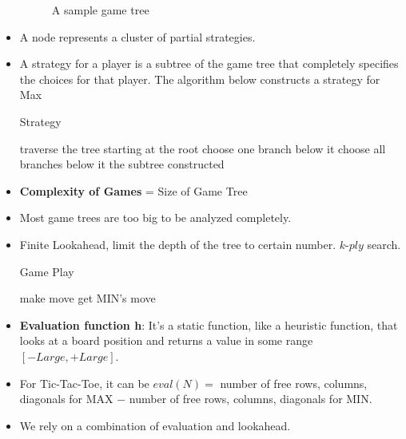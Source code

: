 \documentclass[a4paper]{article}
\begin{document}
\begin{itemize}
\begin{figure}[H]
        \caption{A sample game tree}
    \end{figure}
    \item A node represents a cluster of partial strategies.
    \item A strategy for a player is a subtree of the game tree that completely specifies the choices for that player. The algorithm below constructs a strategy for Max
    \begin{algorithm}[H]
        \caption{Strategy}\label{AI-minimax-strategy}
        \begin{algorithmic}[1]
            \Statex {}
            \State traverse the tree starting at the root
                \State choose one branch below it
                \State choose all branches below it
            \EndIf
            \State \Return the subtree constructed
        \end{algorithmic}
    \end{algorithm}
    \item \textbf{Complexity of Games} = Size of Game Tree
    \item Most game trees are too big to be analyzed completely.
    \item Finite Lookahead, limit the depth of the tree to certain number. $k$-$ply$ search.
    \begin{algorithm}[H]
        \caption{Game Play}\label{AI-game-play}
        \begin{algorithmic}[1]
            \Statex {}
                \State {}
                \State make move
                \State get MIN's move
            \EndWhile
        \end{algorithmic}
    \end{algorithm}
    \item \textbf{Evaluation function h}: It's a static function, like a heuristic function, that looks at a board position and returns a value in some range $[-Large,+Large]$.
    \item For Tic-Tac-Toe, it can be $eval(N)=$ number of free rows, columns, diagonals for MAX $-$ number of free rows, columns, diagonals for MIN.
    \item We rely on a combination of evaluation and lookahead.
\end{itemize}
\pagebreak
\end{document}
